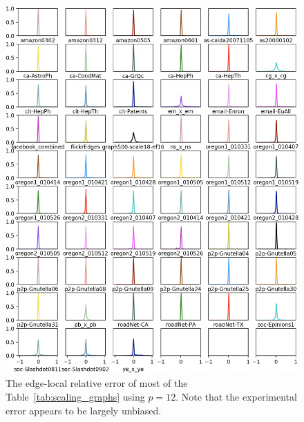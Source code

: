 \documentclass[10]{report}
\begin{document}
\begin{figure}
	\centerline{\includegraphics[width=1.0\columnwidth]{distn_edge_total}}
	\caption{The edge-local relative error of most of the  Table~\ref{tab:scaling_graphs} using $p=12$.
	Note that the experimental error appears to be largely unbiased.
	\label{fig:distn_edge}}
\end{figure}
\end{document}
